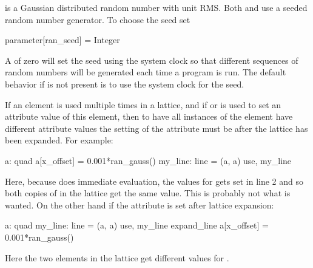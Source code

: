  is a Gaussian distributed random number with unit RMS. 
Both  and  use a seeded random number generator. 
To choose the seed set 
\begin{example}
  parameter[ran_seed] = Integer
\end{example}
A  of zero will set the seed using the system clock so that
different sequences of random numbers will be generated each time a
program is run.  The default behavior if  is
not present is to use the system clock for the seed.

If an element is used multiple times in a lattice, and if  or
 is used to set an attribute value of this element, then
to have all instances of the element have different attribute values
the setting of the attribute must be after the lattice has been
expanded. For example:
\begin{example}
  a: quad 
  a[x_offset] = 0.001*ran_gauss()
  my_line: line = (a, a)
  use, my_line
\end{example}
Here, because \bmad does immediate evaluation, the 
values for  gets set in line 2 and so both copies of  in
the lattice get the same value. This is probably not what is wanted.
On the other hand if the attribute is set after lattice expansion:
\begin{example}
  a: quad 
  my_line: line = (a, a)
  use, my_line
  expand_line
  a[x_offset] = 0.001*ran_gauss()
\end{example}
Here the two  elements in the lattice get different values for
.
